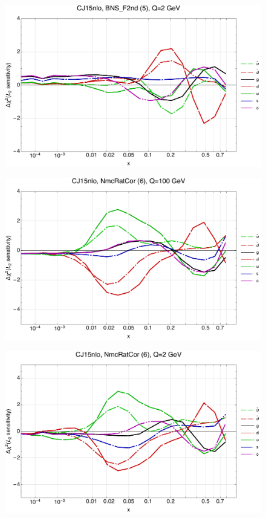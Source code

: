 \documentclass[10pt,aps,prd,floatfix,titlepage]{revtex4}
\begin{document}
\begin{figure}
\includegraphics[width=\textwidth,height=0.44\textheight,keepaspectratio]{1/5_CJ15nlo_L2_q2_Sf_1.pdf}
\caption{}
\end{figure}
\clearpage
\begin{figure}
\includegraphics[width=\textwidth,height=0.44\textheight,keepaspectratio]{1/6_CJ15nlo_L2_q100_Sf_1.pdf}
\caption{}
\end{figure}
\begin{figure}
\includegraphics[width=\textwidth,height=0.44\textheight,keepaspectratio]{1/6_CJ15nlo_L2_q2_Sf_1.pdf}
\caption{}
\end{figure}
\end{document}
